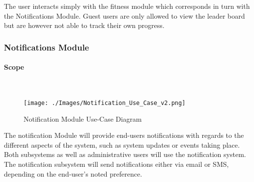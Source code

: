 \documentclass{article}
\begin{document}
		{The user interacts simply with the fitness module which corresponds in turn with the Notifications Module. Guest users are only allowed to view the leader board but are however not able to track their own progress.}
		\subsubsection{Notifications Module}
			\paragraph	{Scope}\mbox{} \\
				\begin{figure}[h]
					\texttt{[image: ./Images/Notification\_Use\_Case\_v2.png]} 
					\caption{Notification Module Use-Case Diagram}
				\end{figure}
			
				{The notification Module will provide end-users notifications with regards to the different aspects of the system, such as system updates or events taking place. Both subsystems as well as administrative users will use the notification system. The notification subsystem will send notifications either via email or SMS, depending on the end-user's noted preference.}		
		
			\newpage
\end{document}
